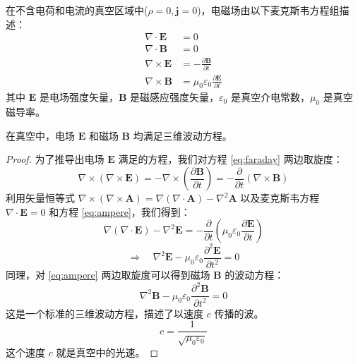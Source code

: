 \documentclass[fontset=none]{ctexart}
\begin{document}
\begin{definition}[真空中的麦克斯韦方程组]
在不含电荷和电流的真空区域中($\rho=0, \bm{j}=0$)，电磁场由以下麦克斯韦方程组描述：
\begin{align}
\nabla \cdot \bm{E} &= 0 \\
\nabla \cdot \bm{B} &= 0 \\
\nabla \times \bm{E} &= -\frac{\partial \bm{B}}{\partial t} \label{eq:faraday} \\
\nabla \times \bm{B} &= \mu_0 \varepsilon_0 \frac{\partial \bm{E}}{\partial t} \label{eq:ampere}
\end{align}
其中 $\bm{E}$ 是电场强度矢量，$\bm{B}$ 是磁感应强度矢量，$\varepsilon_0$ 是真空介电常数，$\mu_0$ 是真空磁导率。
\end{definition}

\begin{theorem}[电磁波的波动方程]
在真空中，电场 $\bm{E}$ 和磁场 $\bm{B}$ 均满足三维波动方程。
\end{theorem}

\begin{proof}
为了推导出电场 $\bm{E}$ 满足的方程，我们对方程 \eqref{eq:faraday} 两边取旋度：
\begin{equation}
\nabla \times (\nabla \times \bm{E}) = -\nabla \times \left(\frac{\partial \bm{B}}{\partial t}\right) = -\frac{\partial}{\partial t}(\nabla \times \bm{B})
\end{equation}
利用矢量恒等式 $\nabla \times (\nabla \times \bm{A}) = \nabla(\nabla \cdot \bm{A}) - \nabla^2 \bm{A}$ 以及麦克斯韦方程 $\nabla \cdot \bm{E} = 0$ 和方程 \eqref{eq:ampere}，我们得到：
\begin{equation}
\nabla(\nabla \cdot \bm{E}) - \nabla^2 \bm{E} = -\frac{\partial}{\partial t}\left(\mu_0 \varepsilon_0 \frac{\partial \bm{E}}{\partial t}\right)
\end{equation}
\begin{equation}
\Rightarrow \quad \nabla^2 \bm{E} - \mu_0 \varepsilon_0 \frac{\partial^2 \bm{E}}{\partial t^2} = 0
\end{equation}
同理，对 \eqref{eq:ampere} 两边取旋度可以得到磁场 $\bm{B}$ 的波动方程：
\begin{equation}
\nabla^2 \bm{B} - \mu_0 \varepsilon_0 \frac{\partial^2 \bm{B}}{\partial t^2} = 0
\end{equation}
这是一个标准的三维波动方程，描述了以速度 $c$ 传播的波。
\begin{equation}
c = \frac{1}{\sqrt{\mu_0 \varepsilon_0}}
\end{equation}
这个速度 $c$ 就是真空中的光速。
\end{proof}
\end{document}
